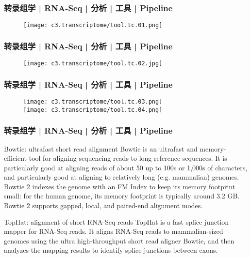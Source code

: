 \begin{frame}
  \frametitle{转录组学 | RNA-Seq | 分析 | 工具 | Pipeline}
  \begin{figure}
    \centering
    \texttt{[image: c3.transcriptome/tool.tc.01.png]}
  \end{figure}
\end{frame}

\begin{frame}
  \frametitle{转录组学 | RNA-Seq | 分析 | 工具 | Pipeline}
  \begin{figure}
    \centering
    \texttt{[image: c3.transcriptome/tool.tc.02.jpg]}
  \end{figure}
\end{frame}

\begin{frame}
  \frametitle{转录组学 | RNA-Seq | 分析 | 工具 | Pipeline}
  \begin{figure}
    \centering
    \texttt{[image: c3.transcriptome/tool.tc.03.png]}\\
    \vspace{0.5em}
    \texttt{[image: c3.transcriptome/tool.tc.04.png]}
  \end{figure}
\end{frame}

\begin{frame}
  \frametitle{转录组学 | RNA-Seq | 分析 | 工具 | Pipeline}
  \begin{block}{Bowtie: ultrafast short read alignment}
    Bowtie is an ultrafast and memory-efficient tool for aligning sequencing reads to long reference sequences. It is particularly good at aligning reads of about 50 up to 100s or 1,000s of characters, and particularly good at aligning to relatively long (e.g. mammalian) genomes. Bowtie 2 indexes the genome with an FM Index to keep its memory footprint small: for the human genome, its memory footprint is typically around 3.2 GB. Bowtie 2 supports gapped, local, and paired-end alignment modes.
  \end{block}
  \pause
  \begin{block}{TopHat: alignment of short RNA-Seq reads}
    TopHat is a fast splice junction mapper for RNA-Seq reads. It aligns RNA-Seq reads to mammalian-sized genomes using the ultra high-throughput short read aligner Bowtie, and then analyzes the mapping results to identify splice junctions between exons.
  \end{block}
\end{frame}

